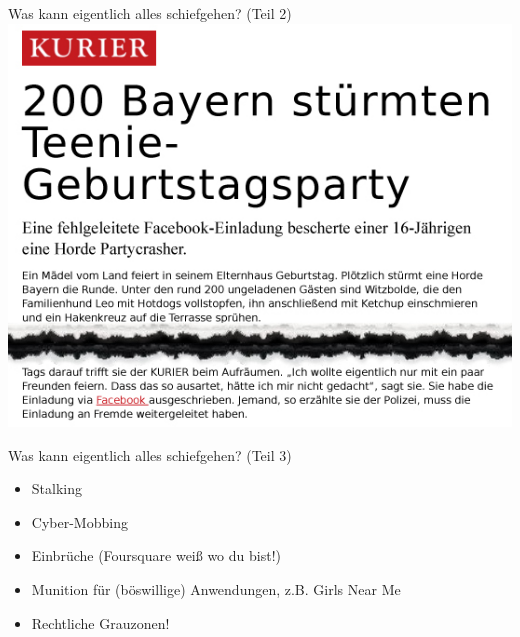 \begin{frame}
	Was kann eigentlich alles schiefgehen? (Teil 2)\\
		\includegraphics[scale=0.5]{facebook-news/facebook-party-200Bayern.jpg}
\end{frame}

\begin{frame}
	Was kann eigentlich alles schiefgehen? (Teil 3)
	\begin{itemize}
		\item Stalking
		\item Cyber-Mobbing
		\item Einbrüche (Foursquare weiß wo du bist!)
		\item Munition für (böswillige) Anwendungen, z.B. Girls Near Me
		\item Rechtliche Grauzonen!
	\end{itemize}
\end{frame}

